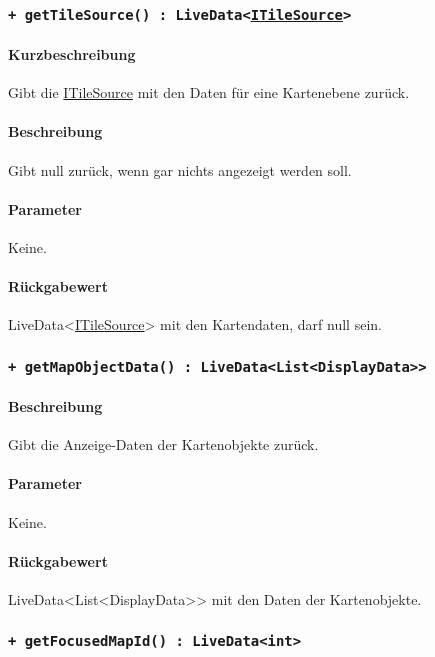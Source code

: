 \subsubsection{\texttt{+ getTileSource() : LiveData<\href{https://osmdroid.github.io/osmdroid/javadocAll/org/osmdroid/tileprovider/tilesource/ITileSource.html}{ITileSource}>}}%
\paragraph*{Kurzbeschreibung}
Gibt die \href{https://osmdroid.github.io/osmdroid/javadocAll/org/osmdroid/tileprovider/tilesource/ITileSource.html}
{ITileSource} mit den Daten für eine Kartenebene zurück.
\paragraph*{Beschreibung}
Gibt null zurück, wenn gar nichts angezeigt werden soll.
\paragraph*{Parameter}
Keine.
\paragraph*{Rückgabewert}
LiveData<\href{https://osmdroid.github.io/osmdroid/javadocAll/org/osmdroid/tileprovider/tilesource/ITileSource.html}
{ITileSource}> mit den Kartendaten, darf null sein.

\subsubsection{\texttt{+ getMapObjectData() : LiveData<List<DisplayData>>}}%
\paragraph*{Beschreibung}
Gibt die Anzeige-Daten der Kartenobjekte zurück.
\paragraph*{Parameter}
Keine.
\paragraph*{Rückgabewert}
LiveData<List<DisplayData>> mit den Daten der Kartenobjekte.

\subsubsection{\texttt{+ getFocusedMapId() : LiveData<int>}}%
